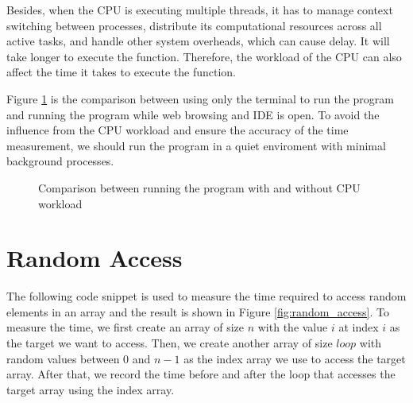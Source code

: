 \documentclass[a4paper,11pt]{article}
\begin{document}
Besides, when the CPU is executing multiple threads, it has to manage context switching between processes, 
distribute its computational resources across all active tasks, and handle other system overheads, which can cause delay.
It will take longer to execute the function. Therefore, the workload of the CPU can also affect the time it takes to 
execute the function.

Figure \ref{fig:clock_accuracy_busy} is the comparison between using only the terminal to run the program and running the program while 
web browsing and IDE is open. To avoid the influence from the CPU workload and ensure the accuracy of the 
time measurement, we should run the program in a quiet enviroment with minimal background processes.

\begin{figure}[h]
  \centering
  \caption{Comparison between running the program with and without CPU workload}
  \label{fig:clock_accuracy_busy}
\end{figure}

\section*{Random Access}

The following code snippet is used to measure the time required to access random
elements in an array and the result is shown in Figure \ref{fig:random_access}.
To measure the time, we first create an array of size $n$ with the value $i$ at index $i$ as the 
target we want to access. Then, we create another array of size $loop$ with random values between 
0 and $n-1$ as the index array we use to access the target array. After that, we record the time 
before and after the loop that accesses the target array using the index array. 
\end{document}
